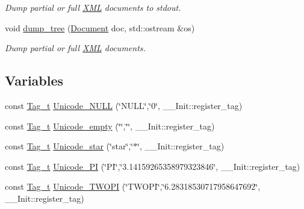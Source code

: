 \begin{DoxyCompactItemize}
\begin{DoxyCompactList}\small\item\em Dump partial or full \hyperlink{namespace_d_d4hep_1_1_x_m_l}{XML} documents to stdout. \item\end{DoxyCompactList}\item 
void \hyperlink{namespace_d_d4hep_1_1_x_m_l_afd8062f9a152e74ef2dee123cf47433e}{dump\_\-tree} (\hyperlink{class_d_d4hep_1_1_x_m_l_1_1_document}{Document} doc, std::ostream \&os)
\begin{DoxyCompactList}\small\item\em Dump partial or full \hyperlink{namespace_d_d4hep_1_1_x_m_l}{XML} documents. \item\end{DoxyCompactList}\end{DoxyCompactItemize}
\subsection*{Variables}
\begin{DoxyCompactItemize}
\item 
const \hyperlink{class_d_d4hep_1_1_x_m_l_1_1_tag__t}{Tag\_\-t} \hyperlink{namespace_d_d4hep_1_1_x_m_l_acab6de83f9ff0b5c2b13d8c1494bc764}{Unicode\_\-NULL} (\char`\"{}NULL\char`\"{},\char`\"{}0\char`\"{}, \_\-\_\-Init::register\_\-tag)
\item 
const \hyperlink{class_d_d4hep_1_1_x_m_l_1_1_tag__t}{Tag\_\-t} \hyperlink{namespace_d_d4hep_1_1_x_m_l_a7a7724cea3f11674936836cef5c23ab7}{Unicode\_\-empty} (\char`\"{}\char`\"{},\char`\"{}\char`\"{}, \_\-\_\-Init::register\_\-tag)
\item 
const \hyperlink{class_d_d4hep_1_1_x_m_l_1_1_tag__t}{Tag\_\-t} \hyperlink{namespace_d_d4hep_1_1_x_m_l_a495000b41f1aa8457f053c7da28f3599}{Unicode\_\-star} (\char`\"{}star\char`\"{},\char`\"{}$\ast$\char`\"{}, \_\-\_\-Init::register\_\-tag)
\item 
const \hyperlink{class_d_d4hep_1_1_x_m_l_1_1_tag__t}{Tag\_\-t} \hyperlink{namespace_d_d4hep_1_1_x_m_l_a7511a1d6521bfeef1fd1c23876d8784a}{Unicode\_\-PI} (\char`\"{}PI\char`\"{},\char`\"{}3.14159265358979323846\char`\"{}, \_\-\_\-Init::register\_\-tag)
\item 
const \hyperlink{class_d_d4hep_1_1_x_m_l_1_1_tag__t}{Tag\_\-t} \hyperlink{namespace_d_d4hep_1_1_x_m_l_a1e1966450a7f5238c27afa75f9e8ac8c}{Unicode\_\-TWOPI} (\char`\"{}TWOPI\char`\"{},\char`\"{}6.28318530717958647692\char`\"{}, \_\-\_\-Init::register\_\-tag)
\end{DoxyCompactItemize}


